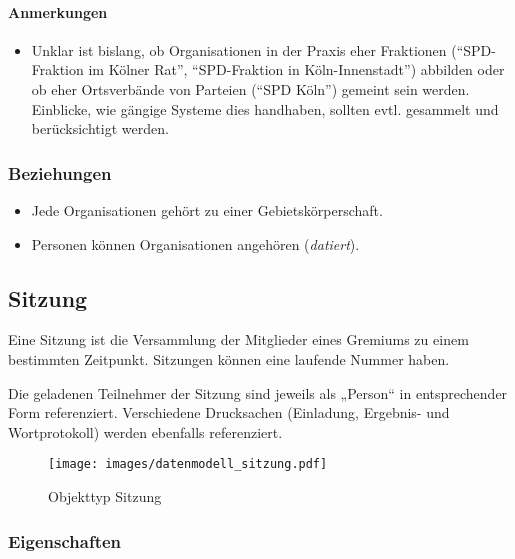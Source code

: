 \documentclass[,a4paper]{article}
\makeatletter
\def\maxwidth{\ifdim\Gin@nat@width>\linewidth\linewidth
\else\Gin@nat@width\fi}
\let\Oldincludegraphics\includegraphics
\renewcommand{\includegraphics}[1]{\Oldincludegraphics[width=\maxwidth]{#1}}
\makeatother
\begin{document}
\paragraph{Anmerkungen}

\begin{itemize}
\item
  Unklar ist bislang, ob Organisationen in der Praxis eher Fraktionen
  (``SPD-Fraktion im Kölner Rat'', ``SPD-Fraktion in Köln-Innenstadt'')
  abbilden oder ob eher Ortsverbände von Parteien (``SPD Köln'') gemeint
  sein werden. Einblicke, wie gängige Systeme dies handhaben, sollten
  evtl. gesammelt und berücksichtigt werden.
\end{itemize}

\subsubsection{Beziehungen}

\begin{itemize}
\item
  Jede Organisationen gehört zu einer Gebietskörperschaft.
\item
  Personen können Organisationen angehören (\emph{datiert}).
\end{itemize}

\subsection{Sitzung}

Eine Sitzung ist die Versammlung der Mitglieder eines Gremiums zu einem
bestimmten Zeitpunkt. Sitzungen können eine laufende Nummer haben.

Die geladenen Teilnehmer der Sitzung sind jeweils als „Person`` in
entsprechender Form referenziert. Verschiedene Drucksachen (Einladung,
Ergebnis- und Wortprotokoll) werden ebenfalls referenziert.

\begin{figure}[htbp]
\centering
\texttt{[image: images/datenmodell\_sitzung.pdf]}
\caption{Objekttyp Sitzung}
\end{figure}

\subsubsection{Eigenschaften}
\end{document}

